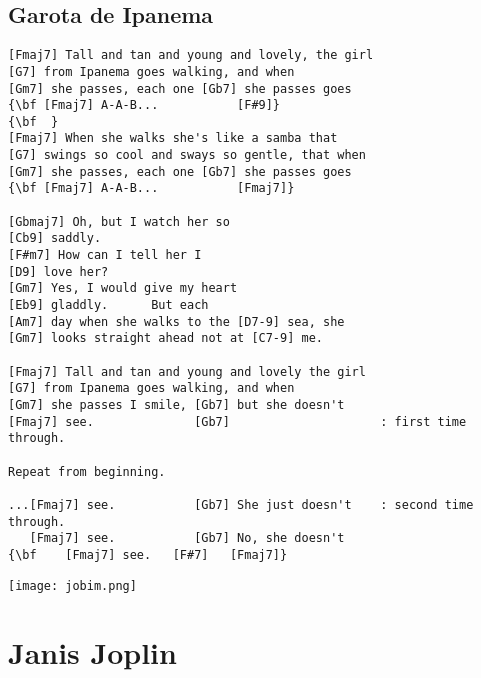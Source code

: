 \documentclass[a4paper]{article}
\begin{document}
\subsection{Garota de Ipanema} %
\label{sub:Garota de Ipanem}
\begin{Verbatim}[commandchars=\\\{\}]
[Fmaj7] Tall and tan and young and lovely, the girl
[G7] from Ipanema goes walking, and when
[Gm7] she passes, each one [Gb7] she passes goes
{\bf [Fmaj7] A-A-B...           [F#9]}
{\bf  }
[Fmaj7] When she walks she's like a samba that
[G7] swings so cool and sways so gentle, that when
[Gm7] she passes, each one [Gb7] she passes goes
{\bf [Fmaj7] A-A-B...           [Fmaj7]}

[Gbmaj7] Oh, but I watch her so
[Cb9] saddly.
[F#m7] How can I tell her I
[D9] love her?
[Gm7] Yes, I would give my heart
[Eb9] gladdly.      But each
[Am7] day when she walks to the [D7-9] sea, she
[Gm7] looks straight ahead not at [C7-9] me.

[Fmaj7] Tall and tan and young and lovely the girl
[G7] from Ipanema goes walking, and when
[Gm7] she passes I smile, [Gb7] but she doesn't
[Fmaj7] see.              [Gb7]                     : first time through.

Repeat from beginning.

...[Fmaj7] see.           [Gb7] She just doesn't    : second time through.
   [Fmaj7] see.           [Gb7] No, she doesn't
{\bf    [Fmaj7] see.   [F#7]   [Fmaj7]}
\end{Verbatim}
\newpage
\centerline{\texttt{[image: jobim.png]}}
\newpage
\section{Janis Joplin} %
\label{sec:Janis Jopli}
\end{document}
